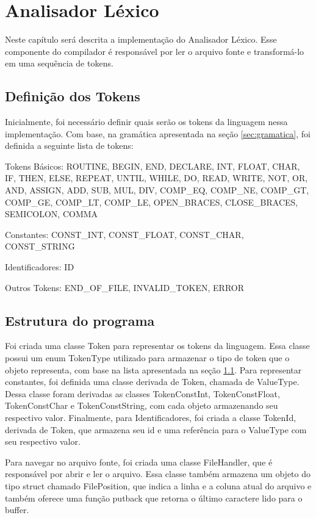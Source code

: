 \chapter{Analisador Léxico}
\label{cap:lexico}
Neste capítulo será descrita a implementação do Analisador Léxico. Esse componente do compilador é responsável por ler o arquivo fonte e transformá-lo em uma sequência de tokens.

\section{Definição dos Tokens}
\label{sec:lexicoDefinicaoTokens}
Inicialmente, foi necessário definir quais serão os tokens da linguagem nessa implementação. Com base, na gramática apresentada na seção \ref{sec:gramatica}, foi definida a seguinte lista de tokens:

Tokens Básicos: ROUTINE, BEGIN, END, DECLARE, INT, FLOAT, CHAR, IF, THEN, ELSE, REPEAT, UNTIL, WHILE, DO, READ, WRITE, NOT, OR, AND, ASSIGN, ADD, SUB, MUL, DIV, COMP\_EQ, COMP\_NE, COMP\_GT, COMP\_GE, COMP\_LT, COMP\_LE, OPEN\_BRACES, CLOSE\_BRACES, SEMICOLON, COMMA

Constantes: CONST\_INT, CONST\_FLOAT, CONST\_CHAR, CONST\_STRING

Identificadores: ID

Outros Tokens: END\_OF\_FILE, INVALID\_TOKEN, ERROR

\section{Estrutura do programa}
\label{sec:lexicoEstrutura}
Foi criada uma classe Token para representar os tokens da linguagem.
Essa classe possui um enum TokenType utilizado para armazenar o tipo de token que o objeto representa, com base na lista apresentada na seção \ref{sec:lexicoDefinicaoTokens}.
Para representar constantes, foi definida uma classe derivada de Token, chamada de ValueType.
Dessa classe foram derivadas as classes TokenConstInt, TokenConstFloat, TokenConstChar e TokenConstString, com cada objeto armazenando seu respectivo valor.
Finalmente, para Identificadores, foi criada a classe TokenId, derivada de Token, que armazena seu id e uma referência para o ValueType com seu respectivo valor.

Para navegar no arquivo fonte, foi criada uma classe FileHandler, que é responsável por abrir e ler o arquivo.
Essa classe também armazena um objeto do tipo struct chamado FilePosition, que indica a linha e a coluna atual do arquivo e também oferece uma função putback que retorna o último caractere lido para o buffer.

